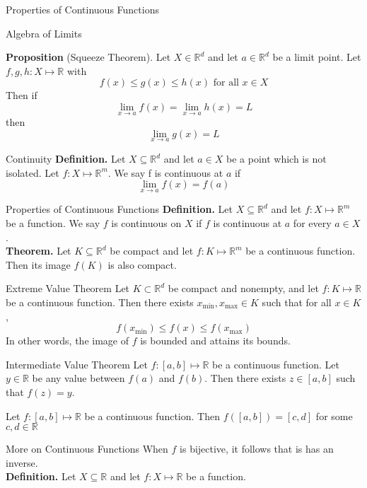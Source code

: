 \documentclass{article}
\begin{document}
\begin{multicols*}{3}
\begin{blackbox}{Properties of Continuous Functions}
\begin{brownbox}{Algebra of Limits}
    \end{brownbox}
    \textbf{Proposition }(Squeeze Theorem). Let $X \in \mathbb{R}^d$ and let $a \in \mathbb{R}^d$ be a limit point. Let $f,g,h: X \mapsto \mathbb{R}$ with 
    $$f(x) \leq g(x) \leq h(x) \text{ for all $x \in X$}$$ 
    Then if
    $$\lim\limits_{x \rightarrow a}  f(x) = \lim\limits_{x \rightarrow a} h(x) = L$$ 
    then 
    $$\lim\limits_{x \rightarrow a} g(x) = L$$
\end{blackbox}
\begin{blackbox}{Continuity}
    \textbf{Definition.} Let $X \subseteq \mathbb{R}^d$ and let $a \in X$ be a point which is not isolated. Let $f:X \mapsto \mathbb{R}^m$. We say f is continuous at $a$ if 
    \[\lim_{x\rightarrow a}f(x) = f(a)\]
\end{blackbox}
\begin{blackbox}{Properties of Continuous Functions}
    \textbf{Definition.} Let $X \subseteq \mathbb{R}^d$ and let $f: X \mapsto \mathbb{R}^m$ be a function. We say $f$ is continuous on $X$ if $f$ is continuous at $a$ for every $a \in X$.\\[1ex]
    \textbf{Theorem.} Let $K \subseteq \mathbb{R}^d$ be compact and let $f: K \mapsto \mathbb{R}^m$ be a continuous function. Then its image $f(K)$ is also compact. 
    \begin{redbox}{Extreme Value Theorem}
        Let $K \subset \mathbb{R}^d$ be compact and nonempty, and let $f: K \mapsto \mathbb{R}$ be a continuous function. Then there exists $x_{\min}, x_{\max} \in K$ such that for all $x \in K$, \\[-1ex]
        \[f(x_{\min}) \leq f(x) \leq f(x_{\max})\]
        In other words, the image of $f$ is bounded and attains its bounds.
    \end{redbox}
    \begin{brownbox}{Intermediate Value Theorem}
        Let $f: [a,b] \mapsto \mathbb{R}$ be a continuous function. Let $y \in \mathbb{R}$ be any value between $f(a)$ and $f(b)$. Then there exists $z \in [a,b]$ such that $f(z) = y$. 
    \end{brownbox}
    Let $f: [a,b] \mapsto \mathbb{R}$ be a continuous function. Then $f([a,b]) = [c,d]$ for some $c,d \in \mathbb{R}$
\end{blackbox}
\begin{blackbox}{More on Continuous Functions}
    When $f$ is bijective, it follows that is has an inverse.\\[1ex]
    \textbf{Definition.} Let $X \subseteq \mathbb{R}$ and let $f: X \mapsto \mathbb{R}$ be a function. 

\end{blackbox}
\end{multicols*}
\end{document}
